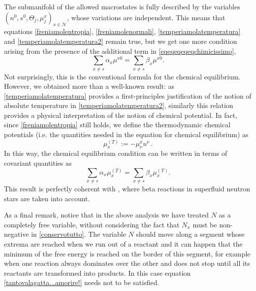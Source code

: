 \documentclass[usenatbib]{mnras}
\begin{document}
The submanifold of the allowed macrostates is fully described by the variables $(n^0,s^0,\Theta_j,\mu_j^x)_{x \in \mathcal{N}}$, whose variations are independent. 
This means that equations \eqref{freniamolentropia}, \eqref{freniamolenormali}, \eqref{temperiamolatemperatura} and \eqref{temperiamolatemperatura2} remain true, but we get one more condition arising from the presence of the additional term  in \eqref{eqeqeqeqeqchimicissimo},
%
\begin{equation}
\sum_{x \neq s} \alpha_x \mu^{x0} = \sum_{x \neq s}  \beta_x \mu^{x0}.
\end{equation}
%
Not surprisingly, this is the conventional formula for the chemical equilibrium. However, we obtained more than a well-known result: as \eqref{temperiamolatemperatura} provides a first-principles justification of the notion of absolute temperature in \eqref{temperiamolatemperatura2}, similarly this relation provides a physical interpretation of the notion of chemical potential. In fact, since \eqref{freniamolentropia} still holds, we define the thermodynamic chemical potentials (i.e. the quantities needed in the equation for chemical equilibrium) as
%
\begin{equation}\label{chemichiamolachimica}
\mu_x^{(T)} := -\mu^x_\nu u^\nu \, .
\end{equation}
%
In this way,  the chemical equilibrium condition can be written in terms of covariant quantities as
%
\begin{equation}\label{tantovalagatta...amorire!}
\sum_{x \neq s} \alpha_x \mu_x^{(T)} = \sum_{x \neq s}  \beta_x \mu_x^{(T)}.
\end{equation}
%
This result is perfectly coherent with \cite{langlois98}, where beta reactions in superfluid neutron stars are taken into account. 

As a final remark, notice that in the above analysis we have treated $N$ as a completely free variable, without considering the fact that $N_x$ must be non-negative in \eqref{conservotutto}. The variable $N$ should move along a segment whose extrema are reached when we run out of a reactant and it can happen that the minimum of the free energy is reached on the border of this segment, for example when one reaction always dominates over the other and does not stop until all its reactants are transformed into products. In this case equation \eqref{tantovalagatta...amorire!} needs not to be satisfied. 

\end{document}

